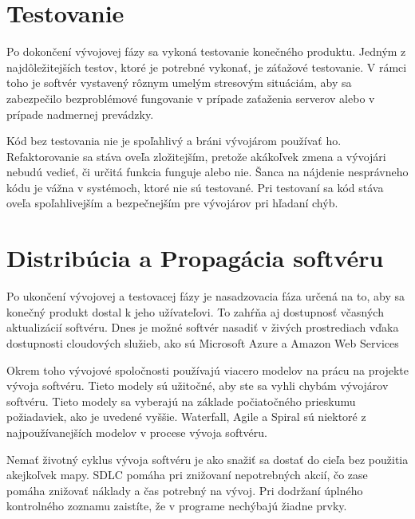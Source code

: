 \documentclass[10pt,twoside,slovak,a4paper]{article}
\begin{document}
\section{Testovanie}
Po dokončení vývojovej fázy sa vykoná testovanie konečného produktu. Jedným z najdôležitejších testov, ktoré je potrebné vykonať, je záťažové testovanie. V rámci toho je softvér vystavený rôznym umelým stresovým situáciám, aby sa zabezpečilo bezproblémové fungovanie v prípade zaťaženia serverov alebo v prípade nadmernej prevádzky.

Kód bez testovania nie je spoľahlivý a bráni vývojárom používať ho. Refaktorovanie sa stáva oveľa zložitejším, pretože akákoľvek zmena a vývojári nebudú vedieť, či určitá funkcia funguje alebo nie. Šanca na nájdenie nesprávneho kódu je vážna v systémoch, ktoré nie sú testované. Pri testovaní sa kód stáva oveľa spoľahlivejším a bezpečnejším pre vývojárov pri hľadaní chýb.



















\section{Distribúcia a Propagácia softvéru}
Po ukončení vývojovej a testovacej fázy je nasadzovacia fáza určená na to, aby sa konečný produkt dostal k jeho užívateľovi. To zahŕňa aj dostupnosť včasných aktualizácií softvéru. Dnes je možné softvér nasadiť v živých prostrediach vďaka dostupnosti cloudových služieb, ako sú Microsoft Azure a Amazon Web Services

Okrem toho vývojové spoločnosti používajú viacero modelov na prácu na projekte vývoja softvéru. Tieto modely sú užitočné, aby ste sa vyhli chybám vývojárov softvéru. Tieto modely sa vyberajú na základe počiatočného prieskumu požiadaviek, ako je uvedené vyššie. Waterfall, Agile a Spiral sú niektoré z najpoužívanejších modelov v procese vývoja softvéru.

Nemať životný cyklus vývoja softvéru je ako snažiť sa dostať do cieľa bez použitia akejkoľvek mapy. SDLC pomáha pri znižovaní nepotrebných akcií, čo zase pomáha znižovať náklady a čas potrebný na vývoj. Pri dodržaní úplného kontrolného zoznamu zaistíte, že v programe nechýbajú žiadne prvky.
\end{document}
